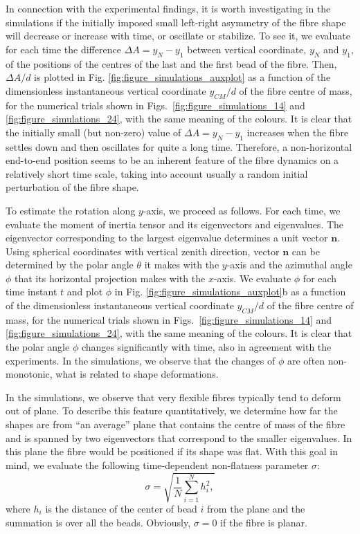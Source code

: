\documentclass{article}
\begin{document}
In connection with the experimental findings, it is worth investigating in the simulations if the initially imposed small left-right asymmetry %
of the fibre shape will decrease or increase with time, or oscillate or stabilize. To see it, we evaluate for each time the difference $\Delta A=y_{N}-y_{1}$ between vertical coordinate, $y_N$ and $y_1$, of the positions of the centres of the last and the first bead of the fibre. Then, $\Delta A/d$ is plotted in Fig. \ref{fig:figure_simulations_auxplot} as a function of the dimensionless instantaneous vertical coordinate $y_{CM}/d$ of the fibre centre of mass, for the numerical trials shown in Figs.~\ref{fig:figure_simulations_14} and \ref{fig:figure_simulations_24}, %
with the same meaning of the colours. It is clear that the initially small (but non-zero) value of $\Delta A=y_{N}-y_{1}$ increases when the fibre settles down and then oscillates for quite a long time. Therefore, a non-horizontal end-to-end position seems to be an inherent feature of the fibre dynamics on a relatively short time scale, taking into account usually a random initial perturbation of the fibre shape. 

To estimate the rotation along $y$-axis, we proceed as follows.
For each time, we evaluate the moment of inertia tensor and its eigenvectors and eigenvalues. 
The eigenvector corresponding to the largest eigenvalue determines a unit vector $\mathbf{n}$. Using spherical coordinates with vertical zenith direction, vector $\mathbf{n}$ can be determined by the polar angle $\theta$ it makes with the $y$-axis and the azimuthal angle $\phi$ that its horizontal projection makes with the $x$-axis. We evaluate $\phi$ for each time instant $t$ and plot $\phi$ %
in Fig. \ref{fig:figure_simulations_auxplot}b as a function of  the dimensionless instantaneous vertical coordinate $y_{CM}/d$ of the fibre centre of mass, for the numerical trials shown in Figs.~\ref{fig:figure_simulations_14} and \ref{fig:figure_simulations_24}, %
with the same meaning of the colours. It is clear that the polar angle $\phi$ changes significantly with time, also in agreement with the experiments. In the simulations, we observe that the changes of $\phi$ are often non-monotonic, what is related to shape deformations.

In the simulations, we observe that very flexible fibres typically tend to deform out of plane. To describe this feature quantitatively, we %
determine how far the shapes are from %
``an average” plane that contains the centre of mass of the fibre and is spanned by %
two eigenvectors that correspond to the smaller eigenvalues.
In this plane the fibre would be positioned if its shape was flat. 
With this goal in mind, we evaluate the following time-dependent non-flatness parameter $\sigma$: %
\begin{equation}
  \sigma = 
  \sqrt{ 
  \frac{ 1 }{ N } \sum_{i=1}^{N}  h_i ^{2} ,
  }
  \label{eq:flatness}
\end{equation}
where $h_i$ is the distance of the center of bead $i$ from the plane and the summation is over all the beads.
Obviously, $\sigma=0$ if the fibre is planar.
\end{document}
